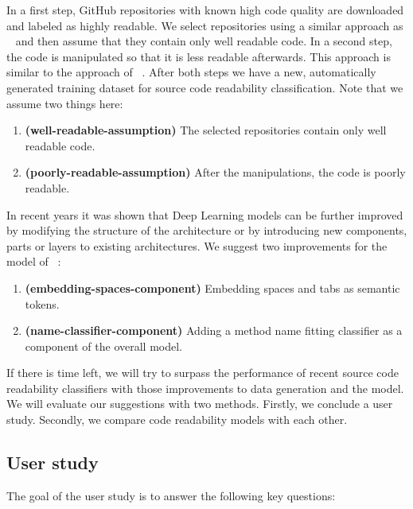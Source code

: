 \documentclass[%
class=scrreprt,
chapterprefix=false,%
open=right,%
twoside=false,%
paper=a4,%
logofile={Logo\_zentral\_farbig\_EN.png},%
thesistype=masterproposal,%
UKenglish,%
]{se2thesis}
\begin{document}
	In a first step, GitHub repositories with known high code quality are downloaded and labeled as highly readable. We select repositories using a similar approach as \citeauthor{allamanis2016convolutional}~\cite{allamanis2016convolutional} and then assume that they contain only well readable code.
	In a second step, the code is manipulated so that it is less readable afterwards. This approach is similar to the approach of \citeauthor{loriot2022styler}~\cite{loriot2022styler}. After both steps we have a new, automatically generated training dataset for source code readability classification.
	Note that we assume two things here:
	\begin{enumerate}
		\item \label{well-readable-assumption} \textbf{(well-readable-assumption)} The selected repositories contain only well readable code.
		\item \label{poorly-readable-assumption} \textbf{(poorly-readable-assumption)} After the manipulations, the code is poorly readable.
	\end{enumerate}
	
	\label{model-modifications}
	In recent years it was shown that Deep Learning models can be further improved by modifying the structure of the architecture or by introducing new components, parts or layers to existing architectures. 
	We suggest two improvements for the model of \citeauthor{mi2022towards}~\cite{mi2022towards}:
	\begin{enumerate}
		\item \label{embedding-spaces-component} \textbf{(embedding-spaces-component)} Embedding spaces and tabs as semantic tokens.
		\item \label{name-classifier-component} \textbf{(name-classifier-component)} Adding a method name fitting classifier as a component of the overall model.
	\end{enumerate}
	
	\label{suggestions} If there is time left, we will try to surpass the performance of recent source code readability classifiers with those improvements to data generation and the model.\\
	
	We will evaluate our suggestions with two methods. Firstly, we conclude a user study. Secondly, we compare code readability models with each other.
	
	\subsection{User study}\label{user-study}
	The goal of the user study is to answer the following key questions:
	
\end{document}
